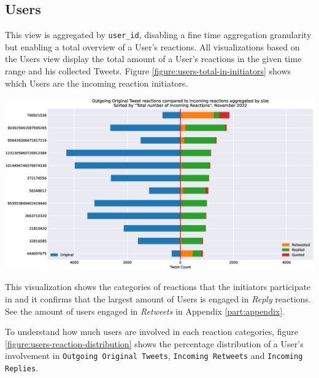 \subsection{Users}
\label{sec:results-users}

This view is aggregated by \texttt{user\_id}, disabling a fine time aggregation granularity but enabling a total overview of a User's reactions. All visualizations based on the Users view display the total amount of a User's reactions in the given time range and his collected Tweets. Figure \ref{figure:users-total-in-initiators} shows which Users are the incoming reaction initiators.

\begin{center}
\includegraphics[width=16cm,keepaspectratio]{figures/users-total-in-initiators.eps}
\label{figure:users-total-in-initiators}
\end{center}

This visualization shows the categories of reactions that the initiators participate in and it confirms that the largest amount of Users is engaged in \textit{Reply} reactions. See the amount of users engaged in \textit{Retweets} in Appendix \ref{part:appendix}. 

To understand how much users are involved in each reaction categories, figure \ref{figure:users-reaction-distribution} shows the percentage distribution of a User's involvement in \texttt{Outgoing Original Tweets}, \texttt{Incoming Retweets} and \texttt{Incoming Replies}.

